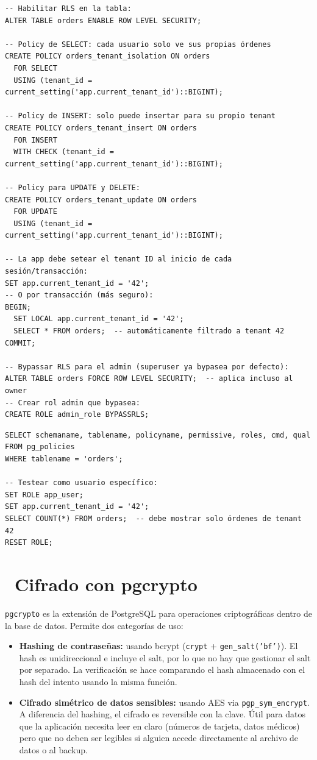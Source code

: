 \begin{lstlisting}[caption={RLS para multi-tenant SaaS}]
-- Habilitar RLS en la tabla:
ALTER TABLE orders ENABLE ROW LEVEL SECURITY;

-- Policy de SELECT: cada usuario solo ve sus propias órdenes
CREATE POLICY orders_tenant_isolation ON orders
  FOR SELECT
  USING (tenant_id = current_setting('app.current_tenant_id')::BIGINT);

-- Policy de INSERT: solo puede insertar para su propio tenant
CREATE POLICY orders_tenant_insert ON orders
  FOR INSERT
  WITH CHECK (tenant_id = current_setting('app.current_tenant_id')::BIGINT);

-- Policy para UPDATE y DELETE:
CREATE POLICY orders_tenant_update ON orders
  FOR UPDATE
  USING (tenant_id = current_setting('app.current_tenant_id')::BIGINT);

-- La app debe setear el tenant ID al inicio de cada sesión/transacción:
SET app.current_tenant_id = '42';
-- O por transacción (más seguro):
BEGIN;
  SET LOCAL app.current_tenant_id = '42';
  SELECT * FROM orders;  -- automáticamente filtrado a tenant 42
COMMIT;

-- Bypassar RLS para el admin (superuser ya bypasea por defecto):
ALTER TABLE orders FORCE ROW LEVEL SECURITY;  -- aplica incluso al owner
-- Crear rol admin que bypasea:
CREATE ROLE admin_role BYPASSRLS;
\end{lstlisting}

\begin{lstlisting}[caption={Verificar policies activas}]
SELECT schemaname, tablename, policyname, permissive, roles, cmd, qual
FROM pg_policies
WHERE tablename = 'orders';

-- Testear como usuario específico:
SET ROLE app_user;
SET app.current_tenant_id = '42';
SELECT COUNT(*) FROM orders;  -- debe mostrar solo órdenes de tenant 42
RESET ROLE;
\end{lstlisting}

\section[Cifrado con pgcrypto]{~Cifrado con pgcrypto}

\texttt{pgcrypto} es la extensión de PostgreSQL para operaciones criptográficas dentro de la base de datos.
Permite dos categorías de uso:

\begin{itemize}
  \item \textbf{Hashing de contraseñas:} usando bcrypt (\texttt{crypt} + \texttt{gen\_salt('bf')}). El hash es unidireccional e incluye el salt, por lo que no hay que gestionar el salt por separado. La verificación se hace comparando el hash almacenado con el hash del intento usando la misma función.
  \item \textbf{Cifrado simétrico de datos sensibles:} usando AES via \texttt{pgp\_sym\_encrypt}. A diferencia del hashing, el cifrado es reversible con la clave. Útil para datos que la aplicación necesita leer en claro (números de tarjeta, datos médicos) pero que no deben ser legibles si alguien accede directamente al archivo de datos o al backup.
\end{itemize}

